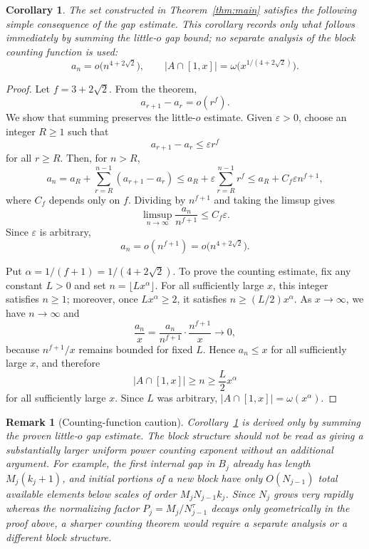 \documentclass[11pt]{article}
\newtheorem{corollary}{Corollary}
\newtheorem{remark}{Remark}
\begin{document}
\begin{corollary}\label{cor:growth}
The set constructed in Theorem~\ref{thm:main} satisfies the following simple consequence of the gap estimate.  This corollary records only what follows immediately by summing the little-$o$ gap bound; no separate analysis of the block counting function is used:
\[
        a_n=o\bigl(n^{4+2\sqrt2}\bigr),
        \qquad
        |A\cap[1,x]|=\omega\bigl(x^{1/(4+2\sqrt2)}\bigr).
\]
\end{corollary}

\begin{proof}
Let $f=3+2\sqrt2$.  From the theorem,
\[
        a_{r+1}-a_r=o(r^f).
\]
We show that summing preserves the little-$o$ estimate.  Given $\varepsilon>0$, choose an integer $R\ge1$ such that
\[
        a_{r+1}-a_r\le \varepsilon r^f
\]
for all $r\ge R$.  Then, for $n>R$,
\[
        a_n
        =a_R+\sum_{r=R}^{n-1}(a_{r+1}-a_r)
        \le
        a_R+\varepsilon\sum_{r=R}^{n-1}r^f
        \le
        a_R+C_f\varepsilon n^{f+1},
\]
where $C_f$ depends only on $f$.  Dividing by $n^{f+1}$ and taking the limsup gives
\[
        \limsup_{n\to\infty}\frac{a_n}{n^{f+1}}\le C_f\varepsilon.
\]
Since $\varepsilon$ is arbitrary,
\[
        a_n=o(n^{f+1})=o\bigl(n^{4+2\sqrt2}\bigr).
\]

Put $\alpha=1/(f+1)=1/(4+2\sqrt2)$.  To prove the counting estimate, fix any constant $L>0$ and set $n=\lfloor Lx^\alpha\rfloor$.  For all sufficiently large $x$, this integer satisfies $n\ge1$; moreover, once $Lx^\alpha\ge2$, it satisfies $n\ge (L/2)x^\alpha$.  As $x\to\infty$, we have $n\to\infty$ and
\[
        \frac{a_n}{x}
        =
        \frac{a_n}{n^{f+1}}\cdot\frac{n^{f+1}}{x}
        \longrightarrow 0,
\]
because $n^{f+1}/x$ remains bounded for fixed $L$.  Hence $a_n\le x$ for all sufficiently large $x$, and therefore
\[
        |A\cap[1,x]|\ge n\ge \frac L2 x^\alpha
\]
for all sufficiently large $x$.  Since $L$ was arbitrary, $|A\cap[1,x]|=\omega(x^\alpha)$.
\end{proof}

\begin{remark}[Counting-function caution]\label{rem:counting-caution}
Corollary~\ref{cor:growth} is derived only by summing the proven little-$o$ gap estimate.  The block structure should not be read as giving a substantially larger uniform power counting exponent without an additional argument.  For example, the first internal gap in $B_j$ already has length $M_j(k_j+1)$, and initial portions of a new block have only $O(N_{j-1})$ total available elements below scales of order $M_jN_{j-1}k_j$.  Since $N_j$ grows very rapidly whereas the normalizing factor $P_j=M_j/N_{j-1}^{\tau}$ decays only geometrically in the proof above, a sharper counting theorem would require a separate analysis or a different block structure.
\end{remark}
\end{document}
